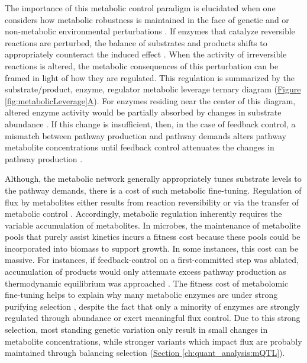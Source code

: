 The importance of this metabolic control paradigm is elucidated when one considers how metabolic robustness is maintained in the face of genetic and or non-metabolic environmental perturbations \cite{Larhlimi:2011ds}. If enzymes that catalyze reversible reactions are perturbed, the balance of substrates and products shifts to appropriately counteract the induced effect \cite{Fendt:2010gr}. When the activity of irreversible reactions is altered, the metabolic consequences of this perturbation can be framed in light of how they are regulated. This regulation is summarized by the substrate/product, enzyme, regulator metabolic leverage ternary diagram (\hyperref[fig:metabolicLeverage]{Figure \ref{fig:metabolicLeverage}A}). For enzymes residing near the center of this diagram, altered enzyme activity would be partially absorbed by changes in substrate abundance \cite{Fendt:2010gr}. If this change is insufficient, then, in the case of feedback control, a mismatch between pathway production and pathway demands alters pathway metabolite concentrations until feedback control attenuates the changes in pathway production \cite{CornishBowden:1995fy}.

Although, the metabolic network generally appropriately tunes substrate levels to the pathway demands, there is a cost of such metabolic fine-tuning. Regulation of flux by metabolites either results from reaction reversibility or via the transfer of metabolic control \cite{CornishBowden:1995fy, Fell:1997wg}. Accordingly, metabolic regulation inherently requires the variable accumulation of metabolites. In microbes, the maintenance of metabolite pools that purely assist kinetics incurs a fitness cost because these pools could be incorporated into biomass to support growth. In some instances, this cost can be massive. For instances, if feedback-control on a first-committed step was ablated, accumulation of products would only attenuate excess pathway production as thermodynamic equilibrium was approached \cite{CornishBowden:1995fy}. The fitness cost of metabolomic fine-tuning helps to explain why many metabolic enzymes are under strong purifying selection \cite{Greenberg:2008uy}, despite the fact that only a minority of enzymes are strongly regulated through abundance or exert meaningful flux control. Due to this strong selection, most standing genetic variation only result in small changes in metabolite concentrations, while stronger variants which impact flux are probably maintained through balancing selection (\hyperref[ch:quant_analysis:mQTL]{Section \ref{ch:quant_analysis:mQTL}}).

